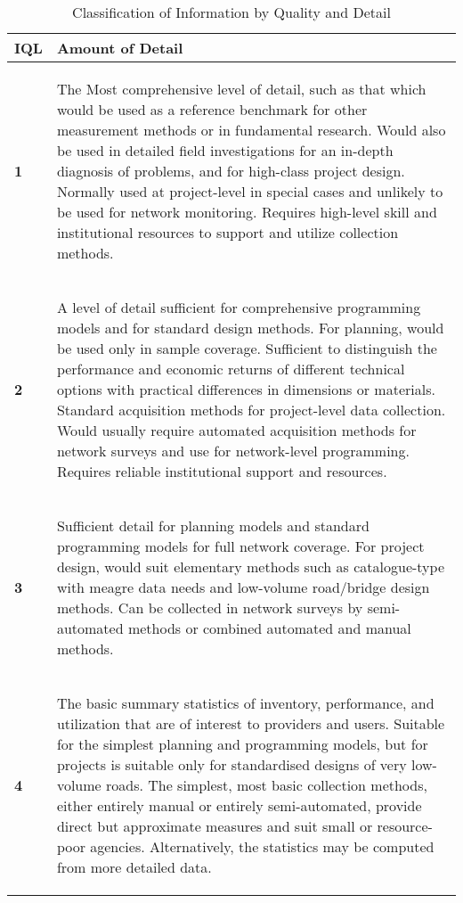 \documentclass[tesi]{subfiles}
\begin{document}
\begin{table}[ht]\label{tb:iql_detail}
\centering
    \begin{tabular}{ | l | p{14cm} |}

    \hline
    \textbf{IQL} & \hspace{5cm}
   \textbf{ Amount of Detail} \\ \hline


    \textbf{1} & \begin{footnotesize}
    The Most comprehensive level of detail, such as that which would be used as a
reference benchmark for other measurement methods or in fundamental
research. Would also be used in detailed field investigations for an in-depth
diagnosis of problems, and for high-class project design. Normally used at
project-level in special cases and unlikely to be used for network monitoring.
Requires high-level skill and institutional resources to support and utilize
collection methods.
    \end{footnotesize}\\
	\textbf{2} & \begin{footnotesize}
	A level of detail sufficient for comprehensive programming models and for
standard design methods. For planning, would be used only in sample coverage.
Sufficient to distinguish the performance and economic returns of different
technical options with practical differences in dimensions or materials. Standard
acquisition methods for project-level data collection. Would usually require
automated acquisition methods for network surveys and use for network-level
programming. Requires reliable institutional support and resources.
	\end{footnotesize} \\
	\textbf{3} &\begin{footnotesize}
	 Sufficient detail for planning models and standard programming models for full
network coverage. For project design, would suit elementary methods such as
catalogue-type with meagre data needs and low-volume road/bridge design
methods. Can be collected in network surveys by semi-automated methods or
combined automated and manual methods.
	\end{footnotesize}\\
	\textbf{4} & \begin{footnotesize}
	The basic summary statistics of inventory, performance, and utilization that are
of interest to providers and users. Suitable for the simplest planning and
programming models, but for projects is suitable only for standardised designs of
very low-volume roads. The simplest, most basic collection methods, either
entirely manual or entirely semi-automated, provide direct but approximate
measures and suit small or resource-poor agencies. Alternatively, the statistics
may be computed from more detailed data.
	\end{footnotesize} \\


\hline
    \end{tabular}
 \caption{Classification of Information by Quality and Detail}
\end{table}
\clearpage
\end{document}
